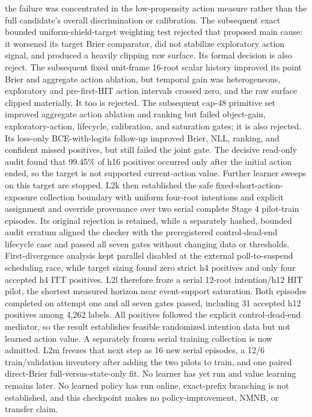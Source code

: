\documentclass[11pt]{article}
\begin{document}
the failure was concentrated in the low-propensity action measure rather than
the full candidate's overall discrimination or calibration.  The subsequent
exact bounded uniform-shield-target weighting test rejected that proposed main
cause: it worsened its target Brier comparator, did not stabilize exploratory
action signal, and produced a heavily clipping raw surface.  Its formal decision
is also reject.  The subsequent fixed unit-frame 16-root scalar history
improved its point Brier and aggregate action ablation, but temporal gain was
heterogeneous, exploratory and pre-first-HIT action intervals crossed zero,
and the raw surface clipped materially.  It too is rejected.  The subsequent
cap-48 primitive set improved aggregate action ablation and ranking but failed
object-gain, exploratory-action, lifecycle, calibration, and saturation gates;
it is also rejected.  Its loss-only BCE-with-logits follow-up improved Brier,
NLL, ranking, and confident missed positives, but still failed the joint gate.
The decisive read-only audit found that 99.45\% of h16 positives occurred only
after the initial action ended, so the target is not supported current-action
value.  Further learner sweeps on this target are stopped.  L2k then
established the safe fixed-short-action-exposure collection boundary with
uniform four-root intentions and explicit assignment and override provenance
over two serial complete Stage 4 pilot-train episodes.  Its original rejection
is retained, while a separately hashed, bounded audit erratum aligned the
checker with the preregistered control-dead-end lifecycle case and passed all
seven gates without changing data or thresholds.  First-divergence analysis
kept parallel disabled at the external poll-to-suspend scheduling race, while
target sizing found zero strict h4 positives and only four accepted h4 ITT
positives.  L2l therefore froze a serial 12-root intention/h12 HIT pilot, the
shortest measured horizon near event-support saturation.  Both episodes
completed on attempt one and all seven gates passed, including 31 accepted h12
positives among 4,262 labels.  All positives followed the explicit
control-dead-end mediator, so the result establishes feasible randomized
intention data but not learned action value.  A separately frozen serial
training collection is now admitted.  L2m freezes that next step as 16 new
serial episodes, a 12/6 train/validation inventory after adding the two pilots
to train, and one paired direct-Brier full-versus-state-only fit.  No learner
has yet run and value learning remains later.
No learned policy has run online, exact-prefix branching is not established,
and this checkpoint makes no policy-improvement, NMNB, or transfer claim.



\end{document}
